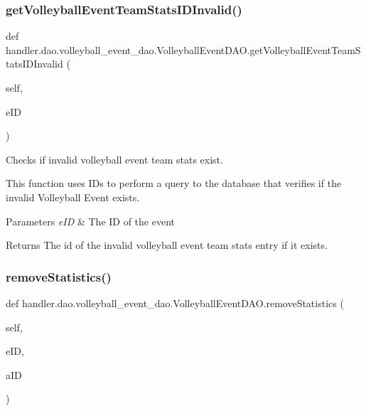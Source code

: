 \subsubsection{\texorpdfstring{get\+Volleyball\+Event\+Team\+Stats\+I\+D\+Invalid()}{getVolleyballEventTeamStatsIDInvalid()}}
{\footnotesize\ttfamily def handler.\+dao.\+volleyball\+\_\+event\+\_\+dao.\+Volleyball\+Event\+D\+A\+O.\+get\+Volleyball\+Event\+Team\+Stats\+I\+D\+Invalid (\begin{DoxyParamCaption}\item[{}]{self,  }\item[{}]{e\+ID }\end{DoxyParamCaption})}



Checks if invalid volleyball event team stats exist. 

This function uses I\+Ds to perform a query to the database that verifies if the invalid Volleyball Event exists.


\begin{DoxyParams}{Parameters}
{\em e\+ID} & The ID of the event\\
\hline
\end{DoxyParams}
\begin{DoxyReturn}{Returns}
The id of the invalid volleyball event team stats entry if it exists. 
\end{DoxyReturn}
\mbox{\label{classhandler_1_1dao_1_1volleyball__event__dao_1_1_volleyball_event_d_a_o_a089bd6d6f2c2cb4bb1c7030d84859043}} 
\subsubsection{\texorpdfstring{remove\+Statistics()}{removeStatistics()}}
{\footnotesize\ttfamily def handler.\+dao.\+volleyball\+\_\+event\+\_\+dao.\+Volleyball\+Event\+D\+A\+O.\+remove\+Statistics (\begin{DoxyParamCaption}\item[{}]{self,  }\item[{}]{e\+ID,  }\item[{}]{a\+ID }\end{DoxyParamCaption})}



